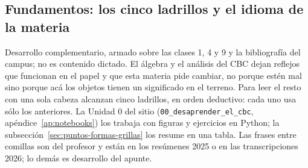 \subsection{Fundamentos: los cinco ladrillos y el idioma de la materia}\label{sec:desaprender}

{\small\vspace{1mm}\par}


Desarrollo complementario, armado sobre las clases 1, 4 y 9 y la
bibliografía del campus; no es contenido dictado. El álgebra y el análisis del CBC dejan
reflejos que funcionan en el papel y que esta materia pide cambiar, no porque estén mal
sino porque acá los objetos tienen un significado en el terreno. Para leer el resto con una
sola cabeza alcanzan cinco ladrillos, en orden deductivo: cada uno usa sólo los anteriores.
La Unidad 0 del sitio (\texttt{00\_desaprender\_el\_cbc}, apéndice~\ref{ap:notebooks}) los
trabaja con figuras y ejercicios en Python; la subsección~\ref{sec:puntos-formas-grillas}
los resume en una tabla. Las frases entre comillas son del profesor y están en los
resúmenes 2025 o en las transcripciones 2026; lo demás es desarrollo del apunte.
